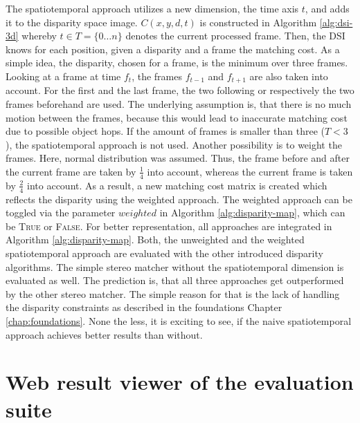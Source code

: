 \noindent The spatiotemporal approach utilizes a new dimension, the time axis $t$, and adds it to the disparity space image.
$C(x,y,d,t)$ is constructed in Algorithm \ref{alg:dsi-3d} whereby $t \in T=\{0{\dots}n\}$ denotes the current processed frame.
Then, the DSI knows for each position, given a disparity and a frame the matching cost.
\newline\newline\noindent As a simple idea, the disparity, chosen for a frame, is the minimum over three frames.
Looking at a frame at time $f_t$, the frames $f_{t-1}$ and $f_{t+1}$ are also taken into account.
For the first and the last frame, the two following or respectively the two frames beforehand are used.
The underlying assumption is, that there is no much motion between the frames, because this would lead to inaccurate matching cost due to possible object hops.
\newline\newline\noindent If the amount of frames is smaller than three ($T < 3$), the spatiotemporal approach is not used.
Another possibility is to weight the frames.
Here, normal distribution was assumed.
Thus, the frame before and after the current frame are taken by $\frac{1}{4}$ into account, whereas the current frame is taken by $\frac{2}{4}$ into account.
As a result, a new matching cost matrix is created which reflects the disparity using the weighted approach.
The weighted approach can be toggled via the parameter $weighted$ in Algorithm \ref{alg:disparity-map}, which can be \textsc{True} or \textsc{False}.
\newline\newline\noindent For better representation, all approaches are integrated in Algorithm \ref{alg:disparity-map}.
Both, the unweighted and the weighted spatiotemporal approach are evaluated with the other introduced disparity algorithms.
The simple stereo matcher without the spatiotemporal dimension is evaluated as well.
The prediction is, that all three approaches get outperformed by the other stereo matcher.
The simple reason for that is the lack of handling the disparity constraints as described in the foundations Chapter \ref{chap:foundations}.
None the less, it is exciting to see, if the naive spatiotemporal approach achieves better results than without.

\section{Web result viewer of the evaluation suite}

